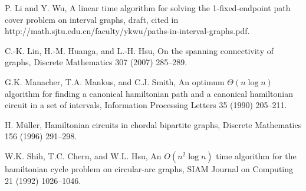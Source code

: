 \documentclass{llncs}
\begin{document}
\begin{thebibliography}{10}
P. Li and Y. Wu, A linear time algorithm for solving the 1-fixed-endpoint path cover problem on interval graphs, draft, cited in
http://math.sjtu.edu.cn/faculty/ykwu/paths-in-interval-graphs.pdf.

C.-K. Lin, H.-M. Huanga, and L.-H. Hsu,
On the spanning connectivity of graphs,
Discrete Mathematics 307 (2007) 285--289.

G.K. Manacher, T.A. Mankus, and C.J. Smith, An optimum $\Theta(n\log n)$ algorithm for finding a canonical hamiltonian path and a canonical hamiltonian circuit in a set of intervals, Information Processing Letters 35 (1990) 205--211.

H. M\"uller, Hamiltonian circuits in chordal bipartite graphs, Discrete Mathematics 156 (1996) 291--298.

W.K. Shih, T.C. Chern, and W.L. Hsu, An $O(n^2\log n)$ time algorithm for the hamiltonian cycle problem on circular-arc graphs, SIAM Journal on Computing 21 (1992) 1026--1046.

\end{thebibliography}
\end{document}
